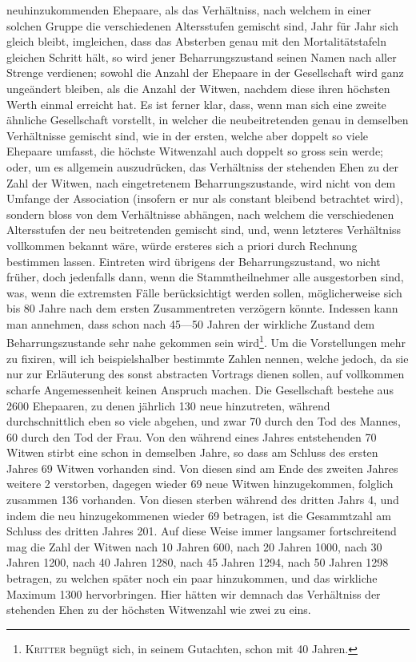 neuhinzukommenden Ehepaare, als das Verhältniss, nach welchem in einer solchen Gruppe die verschiedenen Altersstufen gemischt sind, Jahr für Jahr sich gleich bleibt, imgleichen, dass das Absterben genau mit den Mortalitätstafeln gleichen Schritt hält, so wird jener Beharrungszustand seinen Namen nach aller Strenge verdienen; sowohl die Anzahl der Ehepaare in der Gesellschaft wird ganz ungeändert bleiben, als die Anzahl der Witwen, nachdem diese ihren höchsten Werth einmal erreicht hat. Es ist ferner klar, dass, wenn man sich eine zweite ähnliche Gesellschaft vorstellt, in welcher die neubeitretenden genau in demselben Verhältnisse gemischt sind, wie in der ersten, welche aber doppelt so viele Ehepaare umfasst, die höchste Witwenzahl auch doppelt so gross sein werde; oder, um es allgemein auszudrücken, das Verhältniss der stehenden Ehen zu der Zahl der Witwen, nach eingetretenem Beharrungszustande, wird nicht von dem Umfange der Association (insofern er nur als constant bleibend betrachtet wird), sondern bloss von dem Verhältnisse abhängen, nach welchem die verschiedenen Altersstufen der neu beitretenden gemischt sind, und, wenn letzteres Verhältniss vollkommen bekannt wäre, würde ersteres sich a priori durch Rechnung bestimmen lassen. Eintreten wird übrigens der Beharrungszustand, wo nicht früher, doch jedenfalls dann, wenn die Stammtheilnehmer alle ausgestorben sind, was, wenn die extremsten Fälle berücksichtigt werden sollen, möglicherweise sich bis 80 Jahre nach dem ersten Zusammentreten verzögern könnte. Indessen kann man annehmen, dass schon nach 45—50 Jahren der wirkliche Zustand dem Beharrungszustande sehr nahe gekommen sein wird\footnote{\textsc{Kritter} begnügt sich, in seinem Gutachten, schon mit 40 Jahren.}. Um die Vorstellungen mehr zu fixiren, will ich beispielshalber bestimmte Zahlen nennen, welche jedoch, da sie nur zur Erläuterung des sonst abstracten Vortrags dienen sollen, auf vollkommen scharfe Angemessenheit keinen Anspruch machen. Die Gesellschaft bestehe aus 2600 Ehepaaren, zu denen jährlich 130 neue hinzutreten, während durchschnittlich eben so viele abgehen, und zwar 70 durch den Tod des Mannes, 60 durch den Tod der Frau. Von den während eines Jahres entstehenden 70 Witwen stirbt eine schon in demselben Jahre, so dass am Schluss des ersten Jahres 69 Witwen vorhanden sind. Von diesen sind am Ende des zweiten Jahres weitere 2 verstorben, dagegen wieder 69 neue Witwen hinzugekommen, folglich zusammen 136 vorhanden. Von diesen sterben während des dritten Jahrs 4, und indem die neu hinzugekommenen wieder 69 betragen, ist die Gesammtzahl am Schluss des dritten Jahres 201. Auf diese Weise immer langsamer fortschreitend mag die Zahl der Witwen nach 10 Jahren 600, nach 20 Jahren 1000, nach 30 Jahren 1200, nach 40 Jahren 1280, nach 45 Jahren 1294, nach 50 Jahren 1298 betragen, zu welchen später noch ein paar hinzukommen, und das wirkliche Maximum 1300 hervorbringen. Hier hätten wir demnach das Verhältniss der stehenden Ehen zu der höchsten Witwenzahl wie zwei zu eins.

